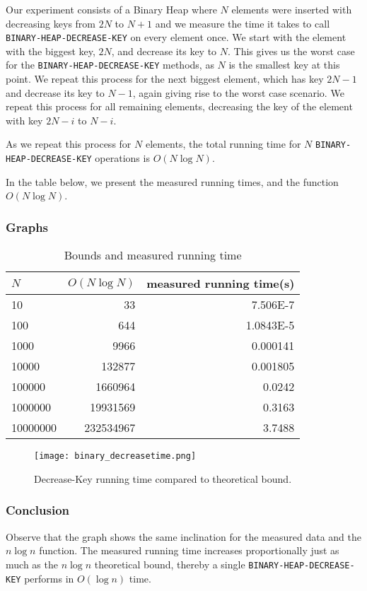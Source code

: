 \documentclass[a4paper,oneside,11pt]{article}
\begin{document}
Our experiment consists of a Binary Heap where $N$ elements were inserted with decreasing keys from $2N$ to $N+1$ and we measure the time it takes to call \texttt{BINARY-HEAP-DECREASE-KEY} on every element once. We start with the element with the biggest key, $2N$, and decrease its key to $N$. This gives us the worst case for the \texttt{BINARY-HEAP-DECREASE-KEY} methods, as $N$ is the smallest key at this point. We repeat this process for the next biggest element, which has key $2N-1$ and decrease its key to $N-1$, again giving rise to the worst case scenario. We repeat this process for all remaining elements, decreasing the key of the element with key $2N-i$ to $N-i$.

As we repeat this process for $N$ elements, the total running time for $N$ \texttt{BINARY-HEAP-DECREASE-KEY} operations is $O(N\log N)$.

In the table below, we present the measured running times, and the function $O(N\log N)$.
\subsubsection*{Graphs}
\begin{table}
  \begin{center}
    \begin{tabular}{l|r|r}
      $N$ & $O(N\log N)$ & measured running time(s)\\
      \hline
      10       & 33         & \num{7.506E-7}\\
      100      & 644        & \num{1.0843E-5}\\
      1000     & 9966       & \num{0.000141}\\
      10000    & 132877     & \num{0.001805}\\
      100000   & 1660964    & \num{0.0242}\\
      1000000  & 19931569   & \num{0.3163}\\
      10000000 & 232534967  & \num{3.7488}
    \end{tabular}
    \caption{Bounds and measured running time}
  \end{center}
\end{table}
\begin{figure}
    \texttt{[image: binary\_decreasetime.png]}
    \caption{Decrease-Key running time compared to theoretical bound.}
\end{figure}

\subsubsection*{Conclusion}
Observe that the graph shows the same inclination for the measured data and the $n\log n$ function. The measured running time increases proportionally just as much as the $n\log n$ theoretical bound, thereby a single \texttt{BINARY-HEAP-DECREASE-KEY} performs in $O(\log n)$ time.
\end{document}
